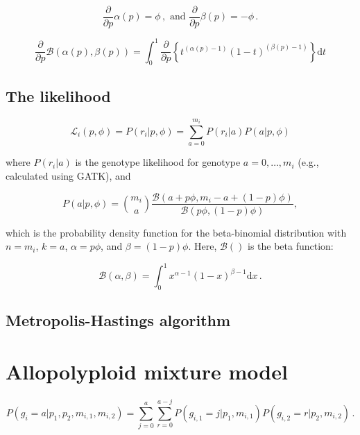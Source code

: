 \documentclass[11pt,english,letterpaper,oneside]{article}
\begin{document}
\begin{equation}
\frac{\partial}{\partial p} \alpha(p) = \phi\,, \text{  and  } \frac{\partial}{\partial p} \beta(p)  = -\phi\,.
\end{equation}

\begin{equation}
\frac{\partial}{\partial p} \mathcal{B}(\alpha(p), \beta(p)) = \int_0^1 \frac{\partial}{\partial p} \left\{t^{(\alpha(p)-1)}(1-t)^{(\beta(p)-1)}\right\} \text{d}t
\end{equation}

\subsection{The likelihood}

\begin{equation}
\mathcal{L}_i(p,\phi) = P(r_i|p,\phi) = \sum_{a=0}^{m_i} P(r_i|a)P(a|p,\phi)
\end{equation}



where $P(r_i|a)$ is the genotype likelihood for genotype $a = 0,\dots,m_i$ (e.g., calculated using GATK), and 

\begin{equation*}
P(a | p,\phi) = \binom{m_i}{a} \frac{\mathcal{B}(a + p\phi, m_i - a + (1 - p)\phi)}{\mathcal{B}(p\phi, (1 - p)\phi)},
\end{equation*}

which is the probability density function for the beta-binomial distribution with $n = m_i$, $k = a$, $\alpha = p\phi$, and $\beta = (1 - p)\phi$. Here, $\mathcal{B}()$ is the beta function:

\begin{equation*}
\mathcal{B}(\alpha,\beta) = \int_0^1 x^{\alpha-1} (1 - x)^{\beta - 1} \text{d}x\, .
\end{equation*}

\subsection{Metropolis-Hastings algorithm}



\section{Allopolyploid mixture model}

\begin{equation}
P(g_i = a|p_1, p_2, m_{i,1}, m_{i,2}) = \sum_{j=0}^a \sum_{r=0}^{a-j} P(g_{i,1} = j|p_1, m_{i,1})P(g_{i,2} = r | p_2, m_{i,2})\,.
\end{equation}
\end{document}
